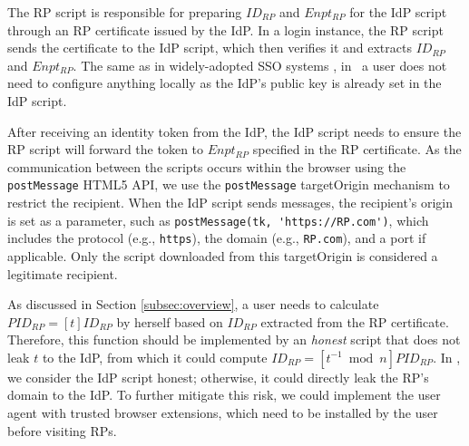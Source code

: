 
The RP script is responsible for preparing $ID_{RP}$ and $Enpt_{RP}$ for the IdP script through an RP certificate issued by the IdP. %
In a login instance, the RP script sends the certificate to the IdP script, which then verifies it and extracts $ID_{RP}$ and $Enpt_{RP}$.
The same as in widely-adopted SSO systems \cite{OpenIDConnect, rfc6749, SAML, SAMLIdentifier}, in \usso~a user does not need to configure anything locally as the IdP's public key is already set in the IdP script.

After receiving an identity token from the IdP, the IdP script needs to ensure the RP script will forward the token to $Enpt_{RP}$ %
specified in the RP certificate.
As the communication between the scripts occurs within the browser using the \verb+postMessage+ HTML5 API, %
we use the \verb+postMessage+ targetOrigin mechanism \cite{postm-targeto} to restrict the recipient. %
 When the IdP script sends messages, the recipient's origin is set as a parameter, such as \verb+postMessage(tk, 'https://RP.com')+, which includes the protocol (e.g., \verb+https+), the domain (e.g., \verb+RP.com+), and a port if applicable.
Only the script downloaded from this targetOrigin is considered a legitimate recipient.


\newc
As discussed in Section \ref{subsec:overview}, a user needs to calculate $PID_{RP} = [t]ID_{RP}$ by herself based on $ID_{RP}$ extracted from the RP certificate. Therefore, this function should be implemented by an \emph{honest} script that does not leak $t$ to the IdP, from which it could compute $ID_{RP} = [t^{-1}\bmod n]PID_{RP}$. In \usso, we consider the IdP script honest; otherwise, it could directly leak the RP's domain to the IdP. To further mitigate this risk, we could implement the user agent with trusted browser extensions, which need to be installed by the user before visiting RPs.
\oldc

